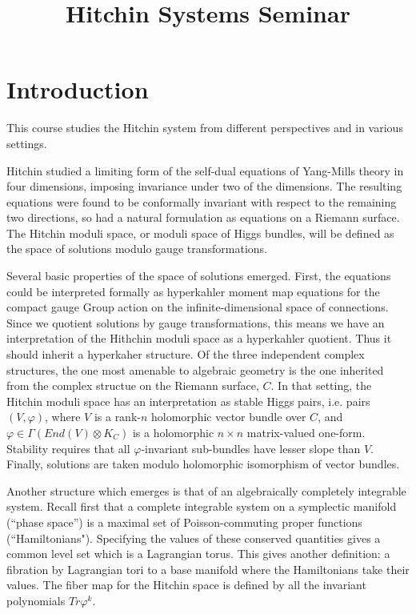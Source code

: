 \documentclass[oneside,english]{amsbook}
\numberwithin{section}{chapter}
\numberwithin{equation}{section}
\numberwithin{figure}{section}
\theoremstyle{plain}
\theoremstyle{definition}
\theoremstyle{remark}
\theoremstyle{definition}
\theoremstyle{definition}
\theoremstyle{plain}
\begin{document}
\title{Hitchin Systems Seminar}

\maketitle
\tableofcontents{}


\chapter{Introduction}

This course studies the Hitchin system from different perspectives and in various settings.

Hitchin studied a limiting form of the self-dual equations of Yang-Mills theory in four dimensions,
imposing invariance under two of the dimensions.  The resulting equations were found to be
conformally invariant with respect to the remaining two directions, so had a natural formulation
as equations on a Riemann surface.  The Hitchin moduli space, or moduli space of Higgs bundles,
will be defined as the space of solutions modulo gauge transformations.

Several basic properties of the space of solutions emerged.  First, the equations could be
interpreted formally as hyperkahler moment map equations for the compact gauge Group action
on the infinite-dimensional space of connections.  Since we quotient solutions by gauge
transformations, this means we have an interpretation of the Hithchin moduli space as a hyperkahler
quotient.  Thus it should inherit a hyperkaher structure.  Of the three independent complex structures,
the one most amenable to algebraic geometry is the one inherited from the complex
structue on the Riemann surface, $C$.  In that setting, the Hitchin moduli space has an
interpretation as stable Higgs pairs, i.e. pairs $(V,\varphi)$, where $V$ is a rank-$n$ holomorphic
vector bundle over $C$, and $\varphi\in \Gamma(End(V)\otimes K_C)$ is a holomorphic $n\times n$
matrix-valued one-form.  Stability requires that all $\varphi$-invariant sub-bundles have lesser slope
than $V$.  Finally, solutions are taken modulo holomorphic isomorphism of vector bundles.

Another structure which emerges is that of an algebraically completely integrable system.
Recall first that a complete integrable system on a symplectic manifold (``phase space'') is a
maximal set of Poisson-commuting proper functions (``Hamiltonians").  Specifying the values
of these conserved quantities gives a common level set which is a Lagrangian torus.
This gives another definition:  a fibration by Lagrangian tori to a base manifold where the
Hamiltonians take their values.  The fiber map for the Hitchin space is defined by all the
invariant polynomials $Tr\varphi^k$.
\end{document}
